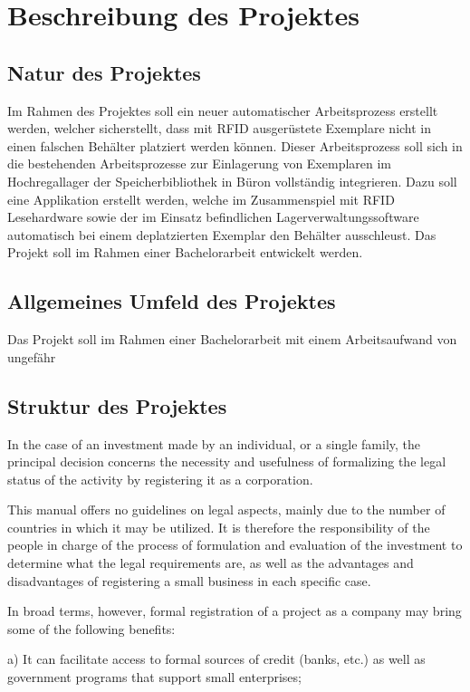 \chapter{Beschreibung des Projektes}

\section{Natur des Projektes}
Im Rahmen des Projektes soll ein neuer automatischer Arbeitsprozess erstellt werden, welcher sicherstellt, dass mit RFID ausgerüstete Exemplare nicht in einen falschen Behälter platziert werden können. Dieser Arbeitsprozess soll sich in die bestehenden Arbeitsprozesse zur Einlagerung von Exemplaren im Hochregallager der Speicherbibliothek in Büron vollständig integrieren. Dazu soll eine Applikation erstellt werden, welche im Zusammenspiel mit RFID Lesehardware sowie der im Einsatz befindlichen Lagerverwaltungssoftware automatisch bei einem deplatzierten Exemplar den Behälter ausschleust. Das Projekt soll im Rahmen einer Bachelorarbeit entwickelt werden.

\section{Allgemeines Umfeld des Projektes}
Das Projekt soll im Rahmen einer Bachelorarbeit mit einem Arbeitsaufwand von ungefähr 

\section{Struktur des Projektes}

In the case of an investment made by an individual, or a single family, the principal decision concerns the necessity and usefulness of formalizing the legal status of the activity by registering it as a corporation.

This manual offers no guidelines on legal aspects, mainly due to the number of countries in which it may be utilized. It is therefore the responsibility of the people in charge of the process of formulation and evaluation of the investment to determine what the legal requirements are, as well as the advantages and disadvantages of registering a small business in each specific case.

In broad terms, however, formal registration of a project as a company may bring some of the following benefits:

a) It can facilitate access to formal sources of credit (banks, etc.) as well as government programs that support small enterprises;

